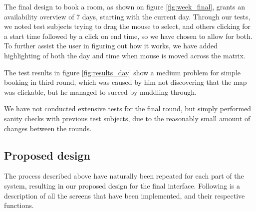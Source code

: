 The final design to book a room, as shown on figure \ref{fig:week_final}, grants an availability overview of 7 days, starting with the current day. Through our tests, we noted test subjects trying to drag the mouse to select, and others clicking for a start time followed by a click on end time, so we have chosen to allow for both.
To further assist the user in figuring out how it works, we have added highlighting of both the day and time when mouse is moved across the matrix.

The test results in figure \ref{fig:results_day} show a medium problem for simple booking in third round, which was caused by him not discovering that the map was clickable, but he managed to succed by muddling through.

We have not conducted extensive tests for the final round, but simply performed sanity checks with previous test subjects, due to the reasonably small amount of changes between the rounds.


\pagebreak
\subsection{Proposed design}
\label{sec:proposed_design_dtd}
The process described above have naturally been repeated for each part of the system, resulting in our proposed design for the final interface.
Following is a description of all the screens that have been implemented, and their respective functions.

